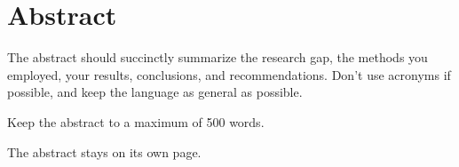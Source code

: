 \newpage%
\clearpage%
\chapter*{Abstract}%
%
%
%

The abstract should succinctly summarize the research gap, the methods you employed, your results, conclusions, and recommendations.  Don’t use acronyms if possible, and keep the language as general as possible.

\medskip

Keep the abstract to a maximum of 500 words.

\medskip

The abstract stays on its own page.